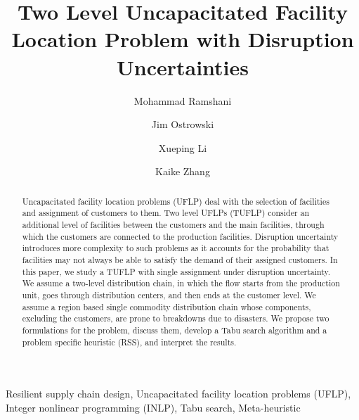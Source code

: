 \documentclass[preprint,review,12pt,3p,authoryear]{elsarticle}
\begin{document}
\begin{frontmatter}
\title{Two Level Uncapacitated Facility Location Problem with Disruption Uncertainties}



\author[mymainaddress]{Mohammad Ramshani}
\author[mymainaddress]{Jim Ostrowski}
\author[mymainaddress]{Xueping Li}
\author[mymainaddress]{Kaike Zhang}


\address[mymainaddress]{Department of Industrial and Systems Engineering, The University of Tennessee at Knoxville, Knoxville, TN 37996, US}


\doublespacing

\begin{abstract}
Uncapacitated facility location problems (UFLP) deal with the selection of facilities and assignment of customers to them. Two level UFLPs (TUFLP) consider an additional level of facilities between the customers and the main facilities, through which the customers are connected to the production facilities. Disruption uncertainty introduces more complexity to such problems as it accounts for the probability that facilities may not always be able to satisfy the demand of their assigned customers. In this paper, we study a TUFLP with single assignment under disruption uncertainty. We assume a two-level distribution chain, in which the flow starts from the production unit, goes through distribution centers, and then ends at the customer level. We assume a region based single commodity distribution chain whose components, excluding the customers, are prone to breakdowns due to disasters. We propose two formulations for the problem, discuss them, develop a Tabu search algorithm and a problem specific heuristic (RSS), and interpret the results.
\end{abstract}

\begin{keyword}
Resilient supply chain design, Uncapacitated facility location problems (UFLP), Integer nonlinear programming (INLP), Tabu search, Meta-heuristic
\end{keyword}

\end{frontmatter}
\end{document}
